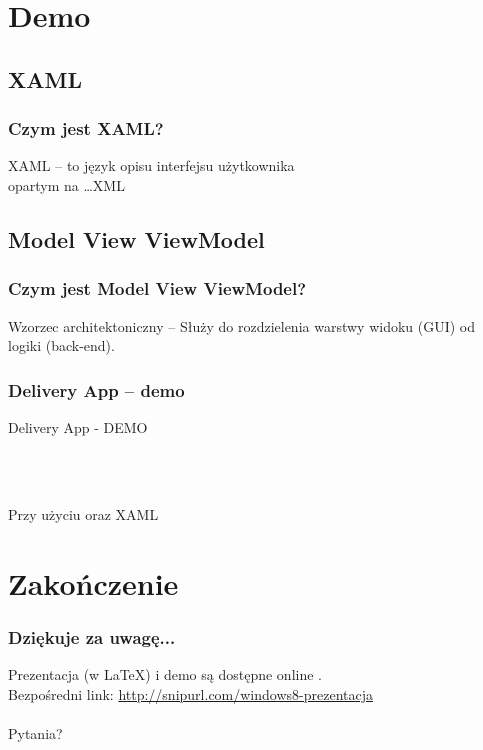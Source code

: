 \documentclass{beamer}
\def\ifmonospace{\ifdim\fontdimen3\font=0pt }
\def\Csharp{%
\ifmonospace%
    C\#%
\else%
    C\kern-.1667em\raise.30ex\hbox{\smaller{\#}}%
\fi%
\spacefactor1000 }
\begin{document}
\section{Demo}
\subsection{XAML}
\begin{frame}
\frametitle{Czym jest XAML?}
XAML -- to język opisu interfejsu użytkownika\\ opartym na \ldots XML
\end{frame}


\subsection{Model View ViewModel}
\begin{frame}
\frametitle{Czym jest Model View ViewModel?}
Wzorzec architektoniczny -- Służy do rozdzielenia warstwy widoku (GUI) od logiki (back-end). \\ 
\end{frame}

\begin{frame}
\frametitle{Delivery App -- demo}

\begin{Huge}
Delivery App - DEMO
\end{Huge}
\\~\\
\begin{large}
Przy użyciu \Csharp oraz XAML
\end{large}

\end{frame}


\section{Zakończenie}
\begin{frame}
\frametitle{Dziękuje za uwagę...}
Prezentacja (w \LaTeX) i demo są dostępne online \href{http://github.com/soltys}{}. \\
Bezpośredni link: \href{http://snipurl.com/windows8-prezentacja}{http://snipurl.com/windows8-prezentacja}\\
\\
Pytania?

\end{frame}
\end{document}
